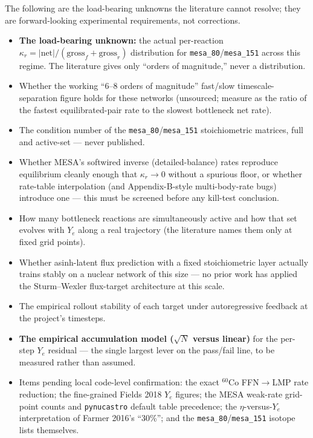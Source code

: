 \documentclass[11pt]{article}
\newcommand{\nuc}[2]{\ensuremath{{}^{#2}\mathrm{#1}}}
\begin{document}
The following are the load-bearing unknowns the literature cannot resolve; they are forward-looking experimental requirements, not corrections.
\begin{itemize}
\item \textbf{The load-bearing unknown:} the actual per-reaction $\kappa_r = |\text{net}|/(\text{gross}_f + \text{gross}_r)$ distribution for \texttt{mesa\_80}/\texttt{mesa\_151} across this regime. The literature gives only ``orders of magnitude,'' never a distribution.
\item Whether the working ``6--8 orders of magnitude'' fast/slow timescale-separation figure holds for these networks (unsourced; measure as the ratio of the fastest equilibrated-pair rate to the slowest bottleneck net rate).
\item The condition number of the \texttt{mesa\_80}/\texttt{mesa\_151} stoichiometric matrices, full and active-set --- never published.
\item Whether MESA's softwired inverse (detailed-balance) rates reproduce equilibrium cleanly enough that $\kappa_r \to 0$ without a spurious floor, or whether rate-table interpolation (and Appendix-B-style multi-body-rate bugs) introduce one --- this must be screened before any kill-test conclusion.
\item How many bottleneck reactions are simultaneously active and how that set evolves with $Y_e$ along a real trajectory (the literature names them only at fixed grid points).
\item Whether asinh-latent flux prediction with a fixed stoichiometric layer actually trains stably on a nuclear network of this size --- no prior work has applied the Sturm--Wexler flux-target architecture at this scale.
\item The empirical rollout stability of each target under autoregressive feedback at the project's timesteps.
\item \textbf{The empirical accumulation model ($\sqrt{N}$ versus linear)} for the per-step $Y_e$ residual --- the single largest lever on the pass/fail line, to be measured rather than assumed.
\item Items pending local code-level confirmation: the exact $\nuc{Co}{60}$ FFN$\to$LMP rate reduction; the fine-grained Fields 2018 $Y_e$ figures; the MESA weak-rate grid-point counts and \texttt{pynucastro} default table precedence; the $\eta$-versus-$Y_e$ interpretation of Farmer 2016's ``30\%''; and the \texttt{mesa\_80}/\texttt{mesa\_151} isotope lists themselves.
\end{itemize}
\end{document}
